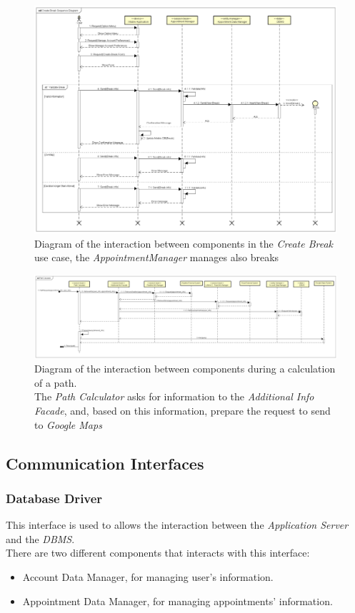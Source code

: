 \begin{figure}[h]
\centering
\includegraphics[width = \textwidth, keepaspectratio = true, angle=90]{Img/CreateBreakSequence}
\caption{Diagram of the interaction between components in the \emph{Create Break} use case, the \emph{AppointmentManager} manages also breaks}
\label{fig:CreateBreakSequence}
\end{figure}

\begin{figure}
\centering
\includegraphics[width = \textwidth, keepaspectratio = true, angle=90]{Img/PathCalculator}
\caption{Diagram of the interaction between components during a calculation of a path.\\
The \emph{Path Calculator} asks for information to the \emph{Additional Info Facade}, and, based on this information, prepare the request to send to \emph{Google Maps}}
\label{fig:PathCalculator}
\end{figure}

\clearpage
\subsection{Communication Interfaces}
\subsubsection{Database Driver}
This interface is used to allows the interaction between the \emph{Application Server} and the \emph{DBMS}.\\
There are two different components that interacts with this interface:
\begin{itemize}
	\item Account Data Manager, for managing user's information.
	\item Appointment Data Manager, for managing appointments' information.
\end{itemize}

